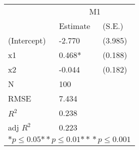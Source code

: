 \begin{tabular}{*{3}{l}}
\hline
                  & \multicolumn{2}{c}{M1}   \tabularnewline
                   &Estimate  &(S.E.)  \tabularnewline
 \hline
 \hline
   (Intercept)     &-2.770   &   (3.985) \tabularnewline
   x1              &0.468*   &   (0.188) \tabularnewline
   x2              &-0.044   &   (0.182) \tabularnewline
 \hline
 N                 &100       &        \tabularnewline
 RMSE             &7.434         & \tabularnewline
 $R^2$             &0.238         & \tabularnewline
 adj $R^2$         &0.223         & \tabularnewline
 \hline
\hline
 
 \multicolumn{3}{c}{${*  p}\le 0.05$${*\!\!*  p}\le 0.01$${*\!\!*\!\!*  p}\le 0.001$}\tabularnewline
 \end{tabular}